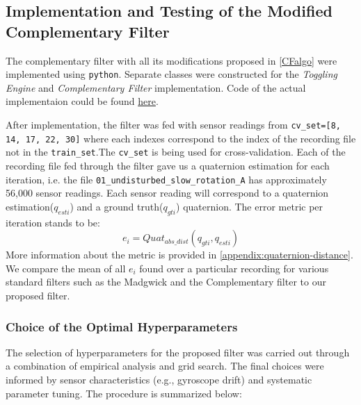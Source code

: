 \documentclass{iutbscthesis}
\begin{document}
\subsection{Implementation and Testing of the Modified Complementary Filter} \label{section:impl-and-testing}
The complementary filter with all its modifications proposed in \autoref{CFalgo} were implemented using \texttt{python}. Separate classes were constructed for the \textit{Toggling Engine} and \textit{Complementary Filter} implementation. Code of the actual implementaion could be found \href{https://github.com/azfarus/NDAG_MARG_THESIS_v2}{here}.
\par
After implementation, the filter was fed with sensor readings from  \texttt{cv\_set=[8, 14, 17, 22, 30]}\label{cv_set} where each indexes correspond to the index of the recording file not in the \texttt{train\_set}.The \texttt{cv\_set} is being used for cross-validation. Each of the recording file fed through the filter gave us a quaternion estimation for each iteration, i.e. the file \texttt{01\_undisturbed\_slow\_rotation\_A} has approximately 56,000 sensor readings. Each sensor reading will correspond to a quaternion estimation($q_{esti}$) and a ground truth($q_{gti}$) quaternion. The error metric per iteration stands to be:
\begin{equation}
    e_i = Quat_{abs\_dist}(q_{gti},q_{esti})
\end{equation}
More information about the metric is provided in \autoref{appendix:quaternion-distance}. We compare the mean of all $e_i$ found over a particular recording for various standard filters such as the Madgwick and the Complementary filter to our proposed filter.

\subsubsection{Choice of the Optimal Hyperparameters}\label{subsubsec:hyperparams}

The selection of hyperparameters for the proposed filter was carried out through a combination of empirical analysis and grid search. The final choices were informed by sensor characteristics (e.g., gyroscope drift) and systematic parameter tuning. The procedure is summarized below:
\end{document}

